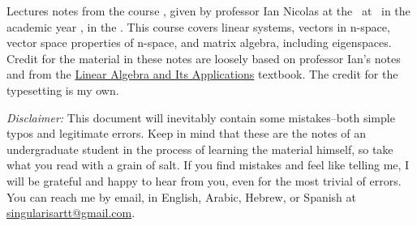 Lectures notes from the course \MyTitle, given by professor Ian Nicolas at the \faculty~at \location~in the academic year \academicyear, in the \term. This course covers linear systems, vectors in n-space, vector space properties of n-space, and matrix algebra, including eigenspaces. Credit for the material in these notes are loosely based on professor Ian's notes and from the \href{https://www.pearson.com/en-us/subject-catalog/p/linear-algebra-and-its-applications/P200000006235}{Linear Algebra and Its Applications} textbook. The credit for the typesetting is my own.

\textit{Disclaimer:} This document will inevitably contain some mistakes--both simple typos and legitimate errors. Keep in mind that these are the notes of an undergraduate student in the process of learning the material himself, so take what you read with a grain of salt. If you find mistakes and feel like telling me, I will be grateful and happy to hear from you, even for the most trivial of errors. You can reach me by email, in English, Arabic, Hebrew, or Spanish at \href{mailto:singularisartt@gmail.com}{singularisartt@gmail.com}.
